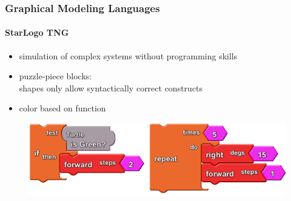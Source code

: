 \documentclass[11 pt,t]{beamer}
\begin{document}
\begin{frame}
\vspace{.5cm}
  \frametitle{Graphical Modeling Languages}
  \framesubtitle{StarLogo TNG}
  \begin{itemize}
   \item simulation of complex systems without programming skills
   \item puzzle-piece blocks: 
	\\shapes only allow syntactically correct constructs
   \item color based on function
  \end{itemize}
  
  \begin{figure}[hbtp]
	\centering
  \includegraphics[width=\textwidth]{../images/StarLogoTNGBlocksEx.PNG}
	\label{fig1}
  \end{figure}
\end{frame}
\end{document}
